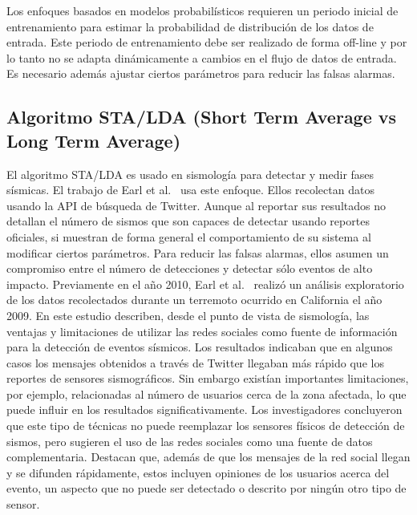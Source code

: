 Los enfoques basados en modelos probabilísticos requieren un periodo inicial de entrenamiento para estimar la probabilidad de distribución de los datos de entrada.
%
Este periodo de entrenamiento debe ser realizado de forma off-line y por lo tanto no se adapta dinámicamente a cambios en el flujo de datos de entrada. 
%
Es necesario además ajustar ciertos parámetros para reducir las falsas alarmas. 


\subsection{Algoritmo STA/LDA (Short Term Average vs Long Term Average)}
\label{sec:stalda}
El algoritmo STA/LDA es usado en sismología para detectar y medir fases sísmicas. 
%
El trabajo de Earl et al.~\cite{earle2012twitter} usa este enfoque. 
%
Ellos recolectan datos usando la API de búsqueda de Twitter. 
%
Aunque al reportar sus resultados no detallan el número de sismos que son capaces de detectar usando reportes oficiales, si muestran de forma general el comportamiento de su sistema al modificar ciertos parámetros. 
%
Para reducir las falsas alarmas, ellos asumen un compromiso entre el número de detecciones y detectar sólo eventos de alto impacto.
%
Previamente en el año 2010, Earl et al.~\cite{earle2010omg} realizó un análisis exploratorio de los datos recolectados durante un terremoto ocurrido en California el año 2009. 
%
En este estudio describen, desde el punto de vista de sismología, las ventajas y limitaciones de utilizar las redes sociales como fuente de información para la detección de eventos sísmicos.
% 
Los resultados indicaban que en algunos casos los mensajes obtenidos a través de Twitter llegaban más rápido que los reportes de sensores sismográficos. 
%
Sin embargo existían importantes limitaciones, por ejemplo, relacionadas al número de usuarios cerca de la zona afectada, lo que puede influir en los resultados significativamente.
%
Los investigadores concluyeron que este tipo de técnicas no puede reemplazar los sensores físicos de detección de sismos, pero sugieren el uso de las redes sociales como una fuente de datos complementaria. 
%
Destacan que, además de que los mensajes de la red social llegan y se difunden rápidamente, estos incluyen opiniones de los usuarios acerca del evento, un aspecto que no puede ser detectado o descrito por ningún otro tipo de sensor. 


